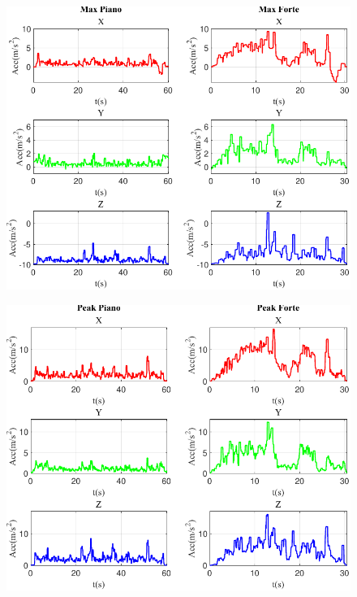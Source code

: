 \documentclass[class=article]{standalone}
\begin{document}
	\begin{center}
		\begin{figure}[h]
			\centering\includegraphics[width=.9\textwidth]{img/lungaFP/Acc/Max}
			\caption[]{}
			\label{fig:AccMax_lungaFP}
		\end{figure}
	\end{center}
	
	\begin{center}
		\begin{figure}[h]
			\centering\includegraphics[width=.9\textwidth]{img/lungaFP/Acc/Peak}
			\caption[]{}
			\label{fig:AccPeak_lungaFP}
		\end{figure}
	\end{center}
		
\end{document}
